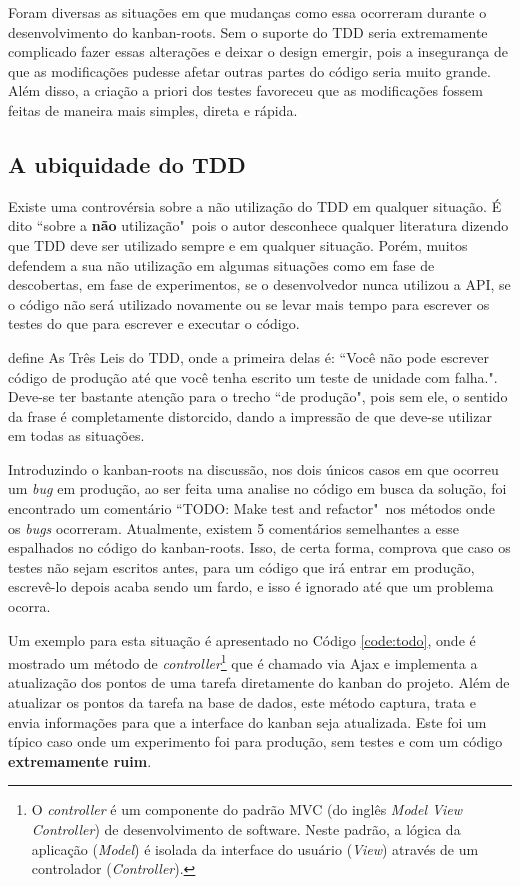 Foram diversas as situações em que mudanças como essa ocorreram durante o desenvolvimento do kanban-roots. Sem o suporte do TDD seria extremamente complicado fazer essas alterações e deixar o design emergir, pois a insegurança de que as modificações pudesse afetar outras partes do código seria muito grande. Além disso, a criação a priori dos testes favoreceu que as modificações fossem feitas de maneira mais simples, direta e rápida.

\subsection{A ubiquidade do TDD}
\label{sub:a_ubiquidade_do_tdd}

Existe uma controvérsia sobre a não utilização do TDD em qualquer situação. É dito ``sobre a \textbf{não} utilização"\ pois o autor desconhece qualquer literatura dizendo que TDD deve ser utilizado sempre e em qualquer situação. Porém, muitos defendem a sua não utilização em algumas situações como em fase de descobertas, em fase de experimentos, se o desenvolvedor nunca utilizou a API, se o código não será utilizado novamente ou se levar mais tempo para escrever os testes do que para escrever e executar o código.

 define As Três Leis do TDD, onde a primeira delas é: ``Você não pode escrever código de produção até que você tenha escrito um teste de unidade com falha.". Deve-se ter bastante atenção para o trecho ``de produção", pois sem ele, o sentido da frase é completamente distorcido, dando a impressão de que deve-se utilizar em todas as situações.

Introduzindo o kanban-roots na discussão, nos dois únicos casos em que ocorreu um \textit{bug} em produção, ao ser feita uma analise no código em busca da solução, foi encontrado um comentário ``TODO: Make test and refactor"\ nos métodos onde os \textit{bugs} ocorreram. Atualmente, existem 5 comentários semelhantes a esse espalhados no código do kanban-roots. Isso, de certa forma, comprova que caso os testes não sejam escritos antes, para um código que irá entrar em produção, escrevê-lo depois acaba sendo um fardo, e isso é ignorado até que um problema ocorra.

Um exemplo para esta situação é apresentado no Código \ref{code:todo}, onde é mostrado um método de \textit{controller}\footnote{O \textit{controller} é um componente do padrão MVC (do inglês \textit{Model View Controller}) de desenvolvimento de software. Neste padrão, a lógica da aplicação (\textit{Model}) é isolada da interface do usuário (\textit{View}) através de um controlador (\textit{Controller}).} que é chamado via Ajax e implementa a atualização dos pontos de uma tarefa diretamente do kanban do projeto. Além de atualizar os pontos da tarefa na base de dados, este método captura, trata e envia informações para que a interface do kanban seja atualizada. Este foi um típico caso onde um experimento foi para produção, sem testes e com um código \textbf{extremamente ruim}.


